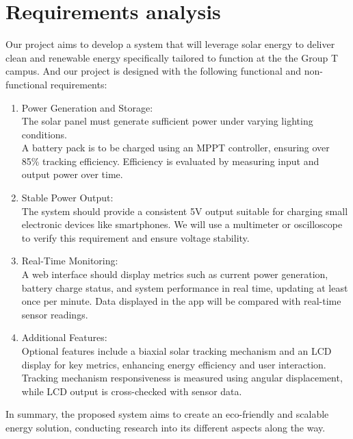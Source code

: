\section{Requirements analysis}




Our project aims to develop a system that will leverage solar energy to  deliver clean and renewable energy specifically tailored to function at the the Group T campus. And our project is designed with the following functional and non-functional requirements:
\begin{enumerate}
    \item Power Generation and Storage:\\
    The solar panel must generate sufficient power under varying lighting conditions.\\
    A battery pack is to be charged using an MPPT controller, ensuring over 85\% tracking efficiency. Efficiency is evaluated by measuring input and output power over time.

    \item Stable Power Output:\\
    The system should provide a consistent 5V output suitable for charging small electronic devices like smartphones. We will use a multimeter or oscilloscope to verify this requirement and ensure voltage stability.

    \item Real-Time Monitoring:\\
    A web interface should display metrics such as current power generation, battery charge status, and system performance in real time, updating at least once per minute. Data displayed in the app will be compared with real-time sensor readings.

    \item Additional Features:\\
    Optional features include a biaxial solar tracking mechanism and an LCD display for key metrics, enhancing energy efficiency and user interaction. Tracking mechanism responsiveness is measured using angular displacement, while LCD output is cross-checked with sensor data.
    
\end{enumerate}

In summary, the proposed system aims to create an eco-friendly and scalable energy solution, conducting research into its different aspects along the way. 

